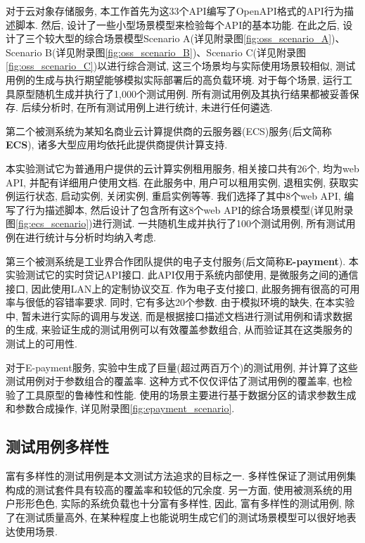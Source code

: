             对于云对象存储服务, 本工作首先为这33个API编写了OpenAPI格式的API行为描述脚本. 然后, 设计了一些小型场景模型来检验每个API的基本功能. 在此之后, 设计了三个较大型的综合场景模型Scenario A(详见附录图\ref{fig:oss_scenario_A})、Scenario B(详见附录图\ref{fig:oss_scenario_B})、Scenario C(详见附录图\ref{fig:oss_scenario_C})以进行综合测试, 这三个场景均与实际使用场景较相似, 测试用例的生成与执行期望能够模拟实际部署后的高负载环境. 对于每个场景, 运行工具原型随机生成并执行了1,000个测试用例. 所有测试用例及其执行结果都被妥善保存. 后续分析时, 在所有测试用例上进行统计, 未进行任何遴选.
            
            第二个被测系统为某知名商业云计算提供商的云服务器(ECS)服务(后文简称\textbf{ECS}), 诸多大型应用均依托此提供商提供计算支持. 
            
            本实验测试它为普通用户提供的云计算实例租用服务, 相关接口共有26个, 均为web API, 并配有详细用户使用文档. 在此服务中, 用户可以租用实例, 退租实例, 获取实例运行状态, 启动实例, 关闭实例, 重启实例等等. 我们选择了其中8个web API, 编写了行为描述脚本, 然后设计了包含所有这8个web API的综合场景模型(详见附录图\ref{fig:ecs_scenario})进行测试. 一共随机生成并执行了100个测试用例, 所有测试用例在进行统计与分析时均纳入考虑.
            
            第三个被测系统是工业界合作团队提供的电子支付服务(后文简称\textbf{E-payment}). 本实验测试它的实时贷记API接口. 此API仅用于系统内部使用, 是微服务之间的通信接口, 因此使用LAN上的定制协议交互. 作为电子支付接口, 此服务拥有很高的可用率与很低的容错率要求. 同时, 它有多达20个参数. 由于模拟环境的缺失, 在本实验中, 暂未进行实际的调用与发送, 而是根据接口描述文档进行测试用例和请求数据的生成, 来验证生成的测试用例可以有效覆盖参数组合, 从而验证其在这类服务的测试上的可用性.
            
            对于E-payment服务, 实验中生成了巨量(超过两百万个)的测试用例, 并计算了这些测试用例对于参数组合的覆盖率. 这种方式不仅仅评估了测试用例的覆盖率, 也检验了工具原型的鲁棒性和性能. 使用的场景主要进行基于数据分区的请求参数生成和参数合成操作, 详见附录图\ref{fig:epayment_scenario}.
            
        \subsection{测试用例多样性}
            富有多样性的测试用例是本文测试方法追求的目标之一. 多样性保证了测试用例集构成的测试套件具有较高的覆盖率和较低的冗余度. 另一方面, 使用被测系统的用户形形色色, 实际的系统负载也十分富有多样性, 因此, 富有多样性的测试用例, 除了在测试质量高外, 在某种程度上也能说明生成它们的测试场景模型可以很好地表达使用场景.
            
